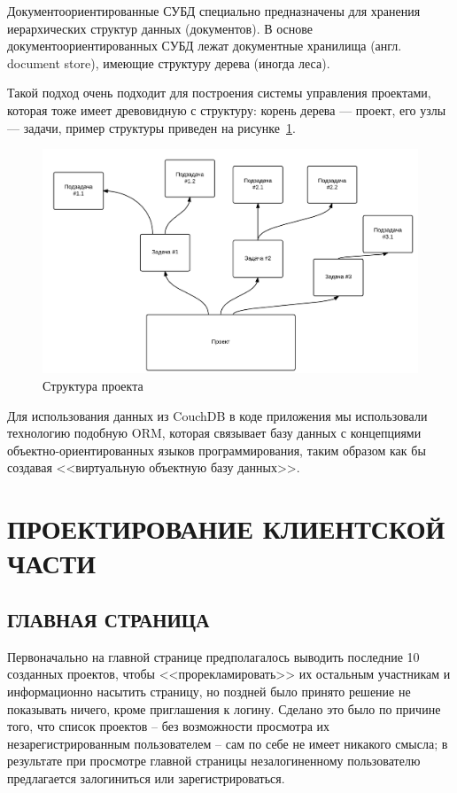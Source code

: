 \documentclass[14pt, a4paper]{extreport}
\begin{document}
Документоориентированные СУБД специально предназначены для хранения иерархических структур
данных (документов). В основе документоориентированных СУБД лежат документные хранилища (англ. document store),
имеющие структуру дерева (иногда леса).

Такой подход очень подходит для построения системы управления проектами, которая тоже имеет древовидную с структуру:
корень дерева --- проект, его узлы --- задачи, пример структуры приведен на рисунке~\ref{fig:project_tree}.

\begin{figure}[!htb]
  \centering
    \includegraphics[scale=0.2]{../slides/images/test_tree.png}
    \caption{Структура проекта}
    \label{fig:project_tree}
\end{figure}

Для использования данных из CouchDB в коде приложения мы использовали технологию подобную ORM,
которая связывает базу данных с концепциями объектно-ориентированных языков программирования,
таким образом как бы создавая <<виртуальную объектную базу данных>>.

\newpage


\chapter{\MakeTextUppercase{Проектирование клиентской части}}
\section{\MakeTextUppercase{Главная страница}}
Первоначально на главной странице предполагалось выводить последние 10 созданных проектов, чтобы <<прорекламировать>> их остальным участникам и информационно насытить страницу, но поздней было принято решение не показывать ничего, кроме приглашения к логину. Сделано это было по причине того, что список проектов -- без возможности просмотра их незарегистрированным пользователем -- сам по себе не имеет никакого смысла; в результате при просмотре главной страницы незалогиненному пользователю предлагается залогиниться или зарегистрироваться.
\end{document}
